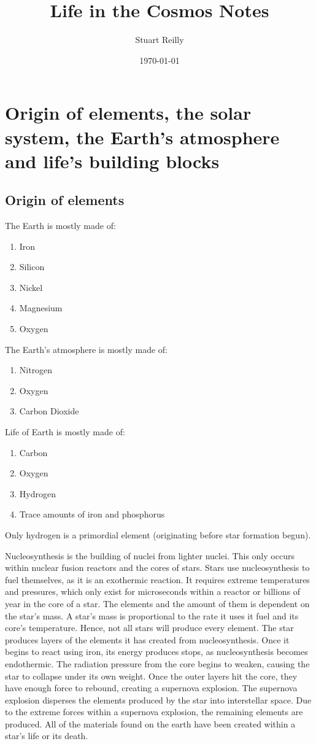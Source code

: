 \documentclass[12pt]{article}
\author{Stuart Reilly}
\date{\today}
\title{Life in the Cosmos Notes}
\begin{document}
\maketitle

\section{Origin of elements, the solar system, the Earth's atmosphere and life's building blocks}
	\subsection{Origin of elements}
	The Earth is mostly made of:
	\begin{enumerate}
		\item Iron
		\item Silicon
		\item Nickel
		\item Magnesium
		\item Oxygen
	\end{enumerate}
	The Earth's atmosphere is mostly made of:
	\begin{enumerate}
		\item Nitrogen
		\item Oxygen
		\item Carbon Dioxide
	\end{enumerate}
	Life of Earth is mostly made of:
	\begin{enumerate}
		\item Carbon
		\item Oxygen
		\item Hydrogen
		\item Trace amounts of iron and phosphorus
	\end{enumerate}
	Only hydrogen is  a primordial element (originating before star formation begun).
	
	Nucleosynthesis is the building of nuclei from lighter nuclei.
	This only occurs within nuclear fusion reactors and the cores of stars.
	Stars use nucleosynthesis to fuel themselves, as it is an exothermic reaction.
	It requires extreme temperatures and pressures, which only exist for microseconds within a reactor or billions of year in the core of a star.
	The elements and the amount of them is dependent on the star's mass.
	A star's mass is proportional to the rate it uses it fuel and its core's temperature.
	Hence, not all stars will produce every element.
	The star produces layers of the elements it has created from nucleosynthesis.
	Once it begins to react using iron, its energy produces stops, as nucleosynthesis becomes endothermic.
	The radiation pressure from the core begins to weaken, causing the star to collapse under its own weight.
	Once the outer layers hit the core, they have enough force to rebound, creating a supernova explosion.
	The supernova explosion disperses the elements produced by the star into interstellar space.
	Due to the extreme forces within a supernova explosion, the remaining elements are produced.
	All of the materials found on the earth have been created within a star's life or its death.
	
\end{document}
